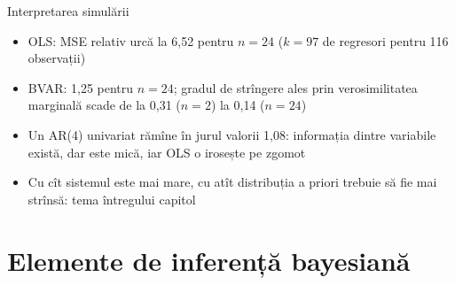 \begin{frame}{Interpretarea simulării}
\itemsize{\small}
\begin{itemize}
    \item OLS: MSE relativ urcă la 6{,}52 pentru $n = 24$ ($k = 97$ de regresori pentru 116 observații)
    \item BVAR: 1{,}25 pentru $n = 24$; gradul de strîngere ales prin verosimilitatea marginală scade de la 0{,}31 ($n = 2$) la 0{,}14 ($n = 24$)
    \item Un AR(4) univariat rămîne în jurul valorii 1{,}08: informația dintre variabile există, dar este mică, iar OLS o irosește pe zgomot
    \item Cu cît sistemul este mai mare, cu atît distribuția a priori trebuie să fie mai strînsă: tema întregului capitol 
\end{itemize}
\end{frame}


\section{Elemente de inferență bayesiană}

